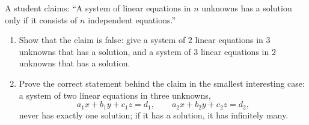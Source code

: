 A student claims: ``A system of linear equations in $n$ unknowns has a solution only if it consists of $n$ independent equations.''
\begin{enumerate}
\item[(a)] Show that the claim is false: give a system of $2$ linear equations in $3$ unknowns that has a solution, and a system of $3$ linear equations in $2$ unknowns that has a solution.
\item[(b)] Prove the correct statement behind the claim in the smallest interesting case: a system of two linear equations in three unknowns,
\[a_1x+b_1y+c_1z=d_1,\qquad a_2x+b_2y+c_2z=d_2,\]
never has exactly one solution; if it has a solution, it has infinitely many.
\end{enumerate}
